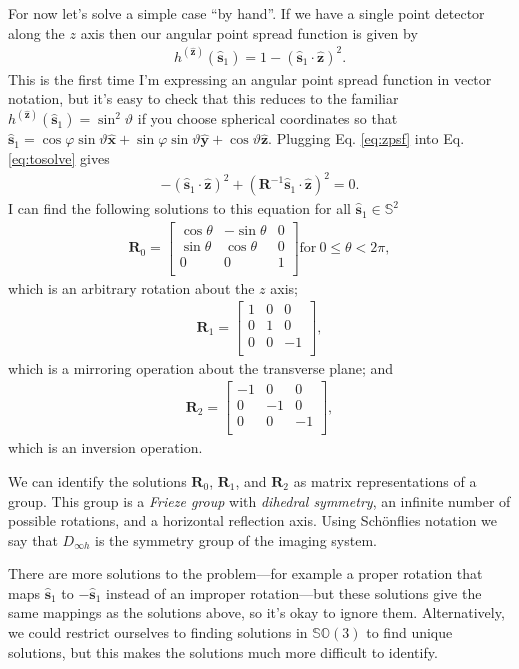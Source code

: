 \documentclass[11pt]{article}
\providecommand{\mb}[1]{\mathbf{#1}}
\providecommand{\so}[1]{\mathbf{\hat{s}}_1}
\providecommand{\mh}[1]{\mathbf{\hat{#1}}}
\begin{document}
For now let's solve a simple case ``by hand''. If we have a single point
detector along the $z$ axis then our angular point spread function is given by
\begin{align}
  h^{(\mh{z})}(\so{}) = 1 - (\so{}\cdot\mh{z})^2. \label{eq:zpsf}
\end{align}
This is the first time I'm expressing an angular point spread function in vector
notation, but it's easy to check that this reduces to the familiar $h^{(\mh{z})}(\so{}) = \sin^2\vartheta$ if you choose spherical coordinates so that $\so{} = \cos\varphi\sin\vartheta\mh{x} + \sin\varphi\sin\vartheta\mh{y} + \cos\vartheta\mh{z}$. Plugging Eq. \ref{eq:zpsf} into Eq. \ref{eq:tosolve} gives
\begin{align}
  -(\so{}\cdot\mh{z})^2 + (\mb{R}^{-1}\so{}\cdot\mh{z})^2 = 0.
\end{align}
I can find the following solutions to this equation for all $\so{} \in \mathbb{S}^2$
\begin{align}
  \mb{R}_0 =
  \begin{bmatrix}
    \cos\theta& -\sin\theta & 0\\
    \sin\theta& \cos\theta & 0\\
    0&0&1\\
  \end{bmatrix} \text{for}\ 0 \leq \theta < 2\pi,
\end{align}
which is an arbitrary rotation about the $z$ axis;
\begin{align}
  \mb{R}_1 =
  \begin{bmatrix}
    1&0&0\\
    0&1&0\\
    0&0&-1\\    
  \end{bmatrix},
\end{align}
which is a mirroring operation about the transverse plane; and
\begin{align}
  \mb{R}_2 =
  \begin{bmatrix}
    -1&0&0\\
    0&-1&0\\
    0&0&-1\\    
  \end{bmatrix},
\end{align}
which is an inversion operation. 

We can identify the solutions $\mb{R}_0$, $\mb{R}_1$, and $\mb{R}_2$ as matrix
representations of a group. This group is a \textit{Frieze group} with
\textit{dihedral symmetry}, an infinite number of possible rotations, and a
horizontal reflection axis. Using Sch\"onflies notation we say that
$D_{\infty h}$ is the symmetry group of the imaging system.

There are more solutions to the problem---for example a proper rotation that
maps $\so{}$ to $-\so{}$ instead of an improper rotation---but these solutions
give the same mappings as the solutions above, so it's okay to ignore them.
Alternatively, we could restrict ourselves to finding solutions in
$\mathbb{SO}(3)$ to find unique solutions, but this makes the solutions much
more difficult to identify. 
\end{document}
